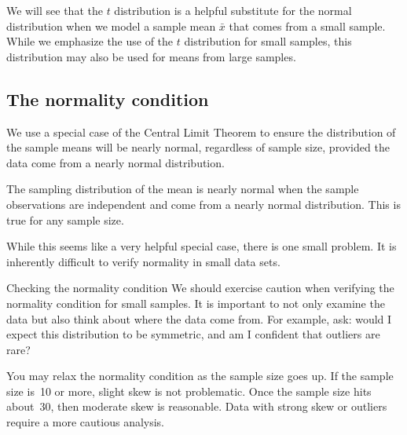 We will see that the $t$ distribution is a helpful substitute for the normal distribution when we model a sample mean $\bar{x}$ that comes from a small sample. While we emphasize the use of the $t$ distribution for small samples, this distribution may also be used for means from large samples.

\subsection{The normality condition}
\label{normalityCond}

We use a special case of the Central Limit Theorem to ensure the distribution of the sample means will be nearly normal, regardless of sample size, provided the data come from a nearly normal distribution.

\begin{termBox}{
The sampling distribution of the mean is nearly normal when the sample observations are independent and come from a nearly normal distribution. This is true for any sample size.
}
\end{termBox}

While this seems like a very helpful special case, there is one small problem. It is inherently difficult to verify normality in small data sets.

\begin{caution}
{Checking the normality condition}
{We should exercise caution when verifying the normality condition for small samples. It is important to not only examine the data but also think about where the data come from. For example, ask: would I expect this distribution to be symmetric, and am I confident that outliers are rare?}
\end{caution}

You may relax the normality condition as the sample size goes up. If the sample size is~10 or more, slight skew is not problematic. Once the sample size hits about~30, then moderate skew is reasonable. Data with strong skew or outliers require a more cautious analysis.


